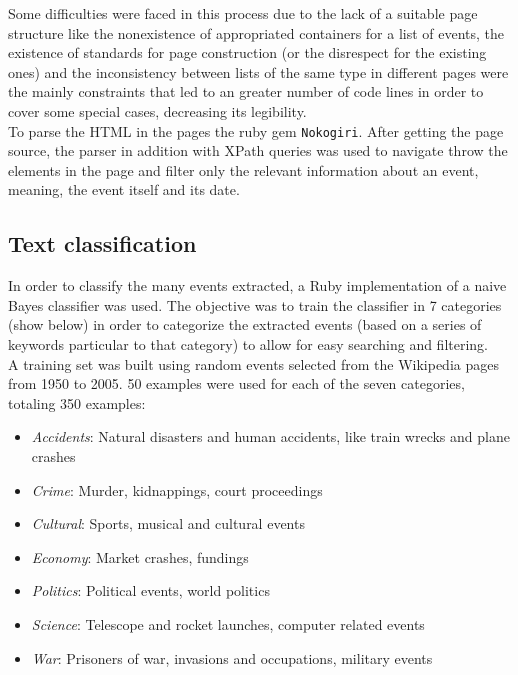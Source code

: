 \documentclass{llncs}
\begin{document}
Some difficulties were faced in this process due to the lack of a suitable page structure like the nonexistence of appropriated containers for a list of events, the existence of standards for page construction (or the disrespect for the existing ones) and the inconsistency between lists of the same type in different pages were the mainly constraints that led to an greater number of code lines in order to cover some special cases, decreasing its legibility.\\

To parse the HTML in the pages the ruby gem \verb!Nokogiri!. After getting the page source, the parser in addition with XPath queries was used to navigate throw the elements in the page and filter only the relevant information about an event, meaning, the event itself and its date.


\subsection{Text classification}
\label{subsec:approach:text-classification}

In order to classify the many events extracted, a Ruby implementation of a naive Bayes classifier\cite{classifier} was used. The objective was to train the classifier in 7 categories (show below) in order to categorize the extracted events (based on a series of keywords particular to that category) to allow for easy searching and filtering.\\

A training set was built using random events selected from the Wikipedia pages from 1950 to 2005. 50 examples were used for each of the seven categories, totaling 350 examples:

\begin{itemize}
	\item \textit{Accidents}: Natural disasters and human accidents, like train wrecks and plane crashes
	\item \textit{Crime}: Murder, kidnappings, court proceedings
	\item \textit{Cultural}: Sports, musical and cultural events
	\item \textit{Economy}: Market crashes, fundings
	\item \textit{Politics}: Political events, world politics
	\item \textit{Science}: Telescope and rocket launches, computer related events
	\item \textit{War}: Prisoners of war, invasions and occupations, military events
\end{itemize}
\end{document}
